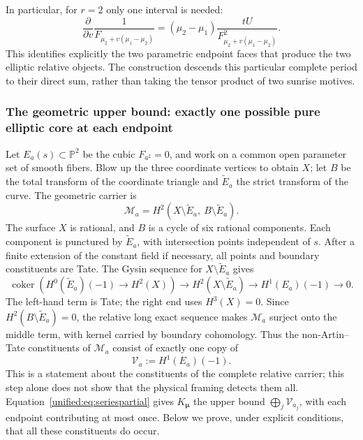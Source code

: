 \documentclass[11pt,a4paper,oneside]{article}
\theoremstyle{plain}
\theoremstyle{definition}
\theoremstyle{remark}
\numberwithin{equation}{section}
\begin{document}
In particular, for $r=2$ only one interval is needed:
\[
 \frac{\partial}{\partial v}\frac1{F_{\mu_2+v(\mu_1-\mu_2)}}
 =(\mu_2-\mu_1)\frac{tU}{F_{\mu_2+v(\mu_1-\mu_2)}^2}.
\]
This identifies explicitly the two parametric endpoint faces that produce the two elliptic relative objects.
The construction descends this particular complete period to their direct sum, rather than taking the tensor product of two sunrise motives.

\subsubsection{The geometric upper bound: exactly one possible pure elliptic core at each endpoint}
Let $E_a(s)\subset\mathbb P^2$ be the cubic $F_{a^2}=0$, and work on a common open parameter set of smooth fibers.
Blow up the three coordinate vertices to obtain $X$; let $B$ be the total transform of the coordinate triangle and $\widetilde E_a$ the strict transform of the curve.
The geometric carrier is
\[
 \mathcal M_a
 =H^2(X\setminus\widetilde E_a,\ B\setminus\widetilde E_a).
\]
The surface $X$ is rational, and $B$ is a cycle of six rational components.
Each component is punctured by $\widetilde E_a$, with intersection points independent of $s$.
After a finite extension of the constant field if necessary, all points and boundary constituents are Tate.
The Gysin sequence for $X\setminus\widetilde E_a$ gives
\[
 \operatorname{coker}\!\left(H^0(\widetilde E_a)(-1)\to H^2(X)\right)
 \longrightarrow H^2(X\setminus\widetilde E_a)
 \longrightarrow H^1(E_a)(-1)\longrightarrow0.
\]
The left-hand term is Tate; the right end uses $H^3(X)=0$.
Since $H^2(B\setminus\widetilde E_a)=0$,
the relative long exact sequence makes $\mathcal M_a$ surject onto the middle term, with kernel carried by boundary cohomology.
Thus the non-Artin--Tate constituents of $\mathcal M_a$ consist of exactly one copy of
\[
 \mathcal V_a:=H^1(E_a)(-1).
\]
This is a statement about the constituents of the complete relative carrier; this step alone does not show that the physical framing detects them all.
Equation~\eqref{unified:eq:seriespartial} gives $K_{\boldsymbol\mu}$ the upper bound
$\bigoplus_j\mathcal V_{a_j}$, with each endpoint contributing at most once.
Below we prove, under explicit conditions, that all these constituents do occur.
\end{document}
